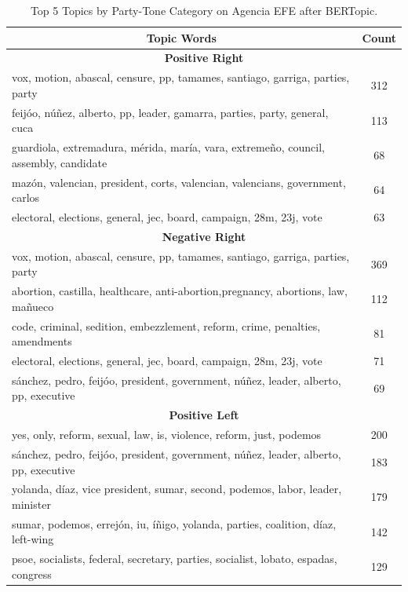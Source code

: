 \documentclass[12pt]{article}
\begin{document}
\begin{table}[!htb]
	\centering
	\caption{Top 5 Topics by Party-Tone Category on Agencia EFE after BERTopic. }
	\begin{tabular}{|l|c|}
		\hline
				\multicolumn{1}{|c|}{\textbf{Topic Words}}& \textbf{Count} \\
		\hline
		\hline
		\multicolumn{2}{|c|}{\textbf{Positive Right}} \\
		\hline
		vox, motion, abascal, censure, pp, tamames, santiago, garriga, parties, party & 312 \\
		feijóo, núñez, alberto, pp, leader, gamarra, parties, party, general, cuca & 113 \\
		guardiola, extremadura, mérida, maría, vara, extremeño, council, assembly, candidate & 68 \\
		mazón, valencian, president, corts, valencian, valencians, government, carlos & 64 \\
		electoral, elections, general, jec, board, campaign, 28m, 23j, vote & 63 \\
		\hline
		\multicolumn{2}{|c|}{\textbf{Negative Right}} \\
		\hline
		vox, motion, abascal, censure, pp, tamames, santiago, garriga, parties, party & 369 \\
		abortion, castilla, healthcare, anti-abortion,pregnancy, abortions, law, mañueco & 112 \\
		code, criminal, sedition, embezzlement, reform, crime, penalties, amendments & 81 \\
		electoral, elections, general, jec, board, campaign, 28m, 23j, vote & 71 \\
		sánchez, pedro, feijóo, president, government, núñez, leader, alberto, pp, executive & 69 \\
		\hline
		\multicolumn{2}{|c|}{\textbf{Positive Left}} \\
		\hline
		yes, only, reform, sexual, law, is, violence, reform, just, podemos & 200 \\
		sánchez, pedro, feijóo, president, government, núñez, leader, alberto, pp, executive & 183 \\
		yolanda, díaz, vice president, sumar, second, podemos, labor, leader, minister & 179 \\
		sumar, podemos, errejón, iu, íñigo, yolanda, parties, coalition, díaz, left-wing & 142 \\
		psoe, socialists, federal, secretary, parties, socialist, lobato, espadas, congress & 129 \\
		\hline

\end{tabular}
\end{table}
\end{document}
